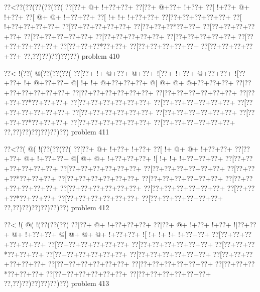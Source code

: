 \vbox{\vbox{\goo
\0??<\0??(\0??(\0??(\0??(\0??(
\0??[\0??+\- @+\- !+\0??+\0??+
\0??[\0??+\- @+\0??+\- !+\0??+
\0??[\- !+\0??+\- @+\- !+\0??+
\0??[\- @+\- @+\- !+\0??+\0??+
\0??[\- !+\- !+\- !+\0??+\0??+
\0??[\0??+\0??+\0??+\0??+\0??+
\0??[\- !+\0??+\0??+\0??+\0??+
\0??[\0??+\0??+\0??+\0??+\0??+
\0??[\0??+\0??+\0??*\0??+\0??+
\0??[\0??+\0??+\0??+\0??+\0??+
\0??[\0??+\0??+\0??+\0??+\0??+
\0??[\0??+\0??+\0??+\0??+\0??+
\0??[\0??+\0??+\0??+\0??+\0??+
\0??[\0??+\0??+\0??+\0??+\0??+
\0??[\0??+\0??+\0??*\0??+\0??+
\0??[\0??+\0??+\0??+\0??+\0??+
\0??[\0??+\0??+\0??+\0??+\0??+
\0??,\0??)\0??)\0??)\0??)\0??)
}
\hfil problem 410\hfil\break
}

\vbox{\vbox{\goo
\0??<\- !(\0??(\- @(\0??(\0??(\0??(
\0??[\0??+\- !+\- @+\0??+\- @+\0??+
\- ![\0??+\- !+\0??+\- @+\0??+\0??+
\- ![\0??+\0??+\- !+\- @+\0??+\0??+
\- @[\- !+\- !+\- @+\0??+\0??+\0??+
\- @[\- @+\- @+\- @+\0??+\0??+\0??+
\0??[\0??+\0??+\0??+\0??+\0??+\0??+
\0??[\0??+\0??+\0??+\0??+\0??+\0??+
\0??[\0??+\0??+\0??+\0??+\0??+\0??+
\0??[\0??+\0??+\0??*\0??+\0??+\0??+
\0??[\0??+\0??+\0??+\0??+\0??+\0??+
\0??[\0??+\0??+\0??+\0??+\0??+\0??+
\0??[\0??+\0??+\0??+\0??+\0??+\0??+
\0??[\0??+\0??+\0??+\0??+\0??+\0??+
\0??[\0??+\0??+\0??+\0??+\0??+\0??+
\0??[\0??+\0??+\0??*\0??+\0??+\0??+
\0??[\0??+\0??+\0??+\0??+\0??+\0??+
\0??[\0??+\0??+\0??+\0??+\0??+\0??+
\0??,\0??)\0??)\0??)\0??)\0??)\0??)
}
\hfil problem 411\hfil\break
}

\vbox{\vbox{\goo
\0??<\0??(\- @(\- !(\0??(\0??(\0??(
\0??[\0??+\- @+\- !+\0??+\- !+\0??+
\0??[\- !+\- @+\- @+\- !+\0??+\0??+
\0??[\0??+\0??+\- @+\- !+\0??+\0??+
\- @[\- @+\- @+\- !+\0??+\0??+\0??+
\- ![\- !+\- !+\- !+\0??+\0??+\0??+
\0??[\0??+\0??+\0??+\0??+\0??+\0??+
\0??[\0??+\0??+\0??+\0??+\0??+\0??+
\0??[\0??+\0??+\0??+\0??+\0??+\0??+
\0??[\0??+\0??+\0??*\0??+\0??+\0??+
\0??[\0??+\0??+\0??+\0??+\0??+\0??+
\0??[\0??+\0??+\0??+\0??+\0??+\0??+
\0??[\0??+\0??+\0??+\0??+\0??+\0??+
\0??[\0??+\0??+\0??+\0??+\0??+\0??+
\0??[\0??+\0??+\0??+\0??+\0??+\0??+
\0??[\0??+\0??+\0??*\0??+\0??+\0??+
\0??[\0??+\0??+\0??+\0??+\0??+\0??+
\0??[\0??+\0??+\0??+\0??+\0??+\0??+
\0??,\0??)\0??)\0??)\0??)\0??)\0??)
}
\hfil problem 412\hfil\break
}

\vbox{\vbox{\goo
\0??<\- !(\- @(\- !(\0??(\0??(\0??(
\0??[\0??+\- @+\- !+\0??+\0??+\0??+
\0??[\0??+\- @+\- !+\0??+\- !+\0??+
\- ![\0??+\0??+\- @+\- !+\0??+\0??+
\- @[\- @+\- @+\- @+\- !+\0??+\0??+
\- ![\- !+\- !+\- !+\- !+\0??+\0??+
\0??[\0??+\0??+\0??+\0??+\0??+\0??+
\0??[\0??+\0??+\0??+\0??+\0??+\0??+
\0??[\0??+\0??+\0??+\0??+\0??+\0??+
\0??[\0??+\0??+\0??*\0??+\0??+\0??+
\0??[\0??+\0??+\0??+\0??+\0??+\0??+
\0??[\0??+\0??+\0??+\0??+\0??+\0??+
\0??[\0??+\0??+\0??+\0??+\0??+\0??+
\0??[\0??+\0??+\0??+\0??+\0??+\0??+
\0??[\0??+\0??+\0??+\0??+\0??+\0??+
\0??[\0??+\0??+\0??*\0??+\0??+\0??+
\0??[\0??+\0??+\0??+\0??+\0??+\0??+
\0??[\0??+\0??+\0??+\0??+\0??+\0??+
\0??,\0??)\0??)\0??)\0??)\0??)\0??)
}
\hfil problem 413\hfil\break
}

